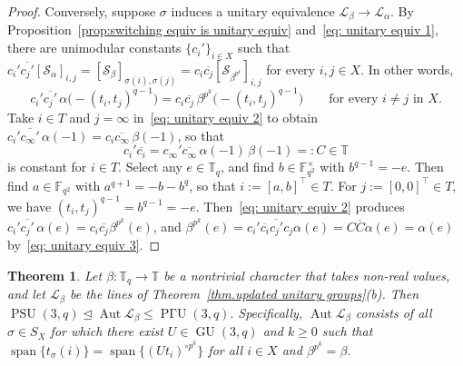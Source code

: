 \documentclass[11pt]{article}
\newtheorem{theorem}[theo]{Theorem}
\theoremstyle{definition}
\numberwithin{equation}{section}
\begin{document}
\begin{proof}
Conversely, suppose $\sigma$ induces a unitary equivalence $\mathscr{L}_\beta \to \mathscr{L}_\alpha$.
By Proposition~\ref{prop:switching equiv is unitary equiv} and~\eqref{eq: unitary equiv 1}, there are unimodular constants $\{c_i' \}_{i \in X}$ such that $c_i' \overline{c_j'} [ \mathcal{S}_{\alpha} ]_{i,j} = [ \mathcal{S}_{\beta} ]_{\sigma(i), \sigma(j)} = c_i \overline{c_j} [ \mathcal{S}_{\beta^{p^k}} ]_{i,j}$ for every $i,j \in X$.
In other words,
\begin{equation}
\label{eq: unitary equiv 2}
c_i' \overline{c_j'} \, \alpha \bigl( - (t_i,t_j)^{q-1} \bigr) = c_i \overline{c_j} \, \beta^{p^k}\bigl( - (t_i, t_j)^{q-1} \bigr)
\qquad
\text{for every $i \neq j$ in $X$}.
\end{equation}
Take $i \in T$ and $j = \infty$ in~\eqref{eq: unitary equiv 2} to obtain $c_i' \overline{ c_\infty' }\, \alpha(-1) = c_i \overline{c_\infty}\, \beta(-1)$, so that
\begin{equation}
\label{eq: unitary equiv 3}
c_i' \overline{c_i} = c_{\infty}' \overline{ c_\infty } \, \alpha(-1)\, \beta(-1) =: C \in \mathbb{T}
\end{equation}
is constant for $i \in T$.
Select any $e \in \mathbb{T}_q$, and find $b \in \mathbb{F}_{q^2}^\times$ with $b^{q-1} = -e$.
Then find $a \in \mathbb{F}_{q^2}$ with $a^{q+1} = -b-b^q$, so that $i:=[a,b]^\top \in T$.
For $j := [0,0]^\top \in T$, we have $(t_i,t_j)^{q-1} = b^{q-1} = -e$.
Then~\eqref{eq: unitary equiv 2} produces $c_i' \overline{c_j'} \, \alpha(e) = c_i \overline{c_j} \beta^{p^k}(e)$, and $\beta^{p^k}(e) = c_i' \overline{c_i} \overline{c_j'} c_j \alpha(e) = C \overline{C} \alpha(e) = \alpha(e)$ by~\eqref{eq: unitary equiv 3}.
\end{proof}

\begin{theorem}
\label{thm:unitary automorphisms}
Let $\beta \colon \mathbb{T}_q \to \mathbb{T}$ be a nontrivial character that takes non-real values, and let $\mathscr{L}_\beta$ be the lines of Theorem~\ref{thm.updated unitary groups}(b).
Then
$
\operatorname{PSU}(3,q) \trianglelefteq \operatorname{Aut} \mathscr{L}_\beta \leq \operatorname{P\text{$\Gamma$}U}(3,q).
$
Specifically, $\operatorname{Aut} \mathscr{L}_\beta$ consists of all $\sigma \in S_X$ for which there exist $U \in \operatorname{GU}(3,q)$ and $k \geq 0$ such that $\operatorname{span}\{ t_{\sigma}(i) \} = \operatorname{span}\{ (U t_i)^{\circ p^k} \}$ for all $i \in X$ and $\beta^{p^k} = \beta$.
\end{theorem}
\end{document}
